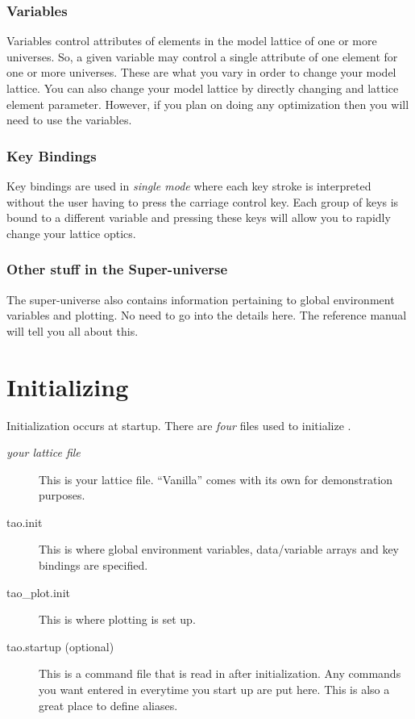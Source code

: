 \subsubsection{Variables}

Variables control attributes of elements in the model lattice of one or more
universes. So, a given variable may control a single attribute of one element
for one or more universes. These are what you vary in order to change
your model lattice. You can also change your model lattice by directly changing
and lattice element parameter. However, if you plan on doing any optimization then 
you will need to use the variables.

\subsubsection{Key Bindings}

Key bindings are used in \textit{single mode} where each key
stroke is interpreted without the user having to press the carriage control key.
Each group of keys is bound to a different variable and pressing these keys will
allow you to rapidly change your lattice optics.

\subsubsection{Other stuff in the Super-universe}

The super-universe also contains information pertaining to global environment variables and
plotting. No need to go into the details here. The \tao reference manual will
tell you all about this.

\section{Initializing \tao}
\label{s:initializing}

Initialization occurs at startup. There are \emph{four} files used to initialize \tao.
  \vspace*{-3ex}
\begin{description}
  \item[\textit{your lattice file}] \Newline
    This is your lattice file. ``Vanilla'' \tao comes with its own for
demonstration purposes.
  \item[tao.init] \Newline 
    This is where global environment variables, data/variable
arrays and key bindings are specified.
  \item[tao\_plot.init] \Newline
    This is where plotting is set up.
  \item[tao.startup (optional)] \Newline
    This is a command file that is read in after initialization. Any commands you
want entered in \tao everytime you start up are put here. This is also a great
place to define aliases.
\end{description}

